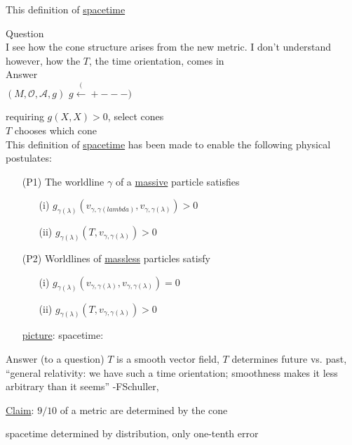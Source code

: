 This definition of \underline{spacetime}

Question \\
I see how the cone structure arises from the new metric. I don't understand however, how the $T$, the time orientation, comes in \\

Answer \\
$(M,\mathcal{O}, \mathcal{A},g)$ $g \xleftarrow (+---)$

requiring $g(X,X)>0$, select cones \\
$T$ chooses which cone \\

This definition of \underline{spacetime} has been made to enable the following physical postulates:
\begin{enumerate}
\item[(P1)] The worldline $\gamma$ of a \underline{massive} particle satisfies
\begin{enumerate}
  \item[(i)] $g_{\gamma(\lambda)}(v_{\gamma, \gamma(lambda)} , v_{\gamma,\gamma(\lambda)} ) >0$
  \item[(ii)] $g_{\gamma(\lambda)}(T, v_{\gamma,\gamma(\lambda)}) >0$
\end{enumerate}
\item[(P2)] Worldlines of \underline{massless} particles satisfy
\begin{enumerate}
\item[(i)] $g_{\gamma(\lambda)}(v_{\gamma,\gamma(\lambda)}, v_{\gamma,\gamma(\lambda)}) = 0$
\item[(ii)] $g_{\gamma(\lambda)}(T,v_{\gamma,\gamma(\lambda)}) >0$
\end{enumerate}
\underline{picture}: spacetime:
\end{enumerate}

Answer (to a question) $T$ is a smooth vector field, $T$ determines future vs. past, ``general relativity: we have such a time orientation; smoothness makes it less arbitrary than it seems'' -FSchuller,


\underline{Claim}: $9/10$ of a metric are determined by the cone

spacetime determined by distribution, only one-tenth error 

